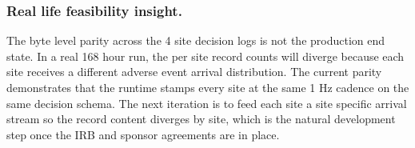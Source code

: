 \begin{sectionaccent}
\subsubsection*{Real life feasibility insight.} The byte level parity
across the 4 site decision logs is not the production end state. In
a real 168 hour run, the per site record counts will diverge because
each site receives a different adverse event arrival distribution.
The current parity demonstrates that the runtime stamps every site
at the same 1 Hz cadence on the same decision schema. The next
iteration is to feed each site a site specific arrival stream so the
record content diverges by site, which is the natural development
step once the IRB and sponsor agreements are in place.


\end{sectionaccent}
